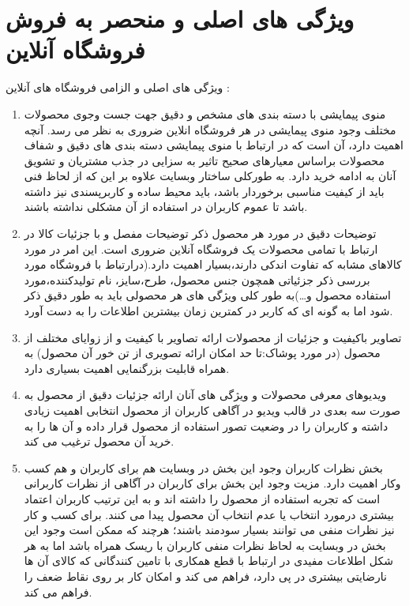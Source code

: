 \documentclass[14pt]{article}
\begin{document}
 
\section{ویژگی های اصلی و منحصر به فروش فروشگاه آنلاین}

ویژگی های اصلی و الزامی فروشگاه های آنلاین :

\begin{flushright}
\begin{enumerate}

\item منوی پیمایشی با دسته بندی های مشخص و دقیق جهت جست وجوی محصولات مختلف
\newline
وجود منوی پیمایشی در هر فروشگاه انلاین ضروری به نظر می رسد. آنچه اهمیت دارد، آن است که در ارتباط با منوی پیمایشی دسته بندی های دقیق و شفاف محصولات براساس معیارهای صحیح تاثیر به سزایی در جذب مشتریان و تشویق آنان به ادامه خرید دارد. به طورکلی ساختار وبسایت علاوه بر این که از لحاظ فنی باید از کیفیت مناسبی برخوردار باشد، باید محیط ساده و کاربرپسندی نیز داشته باشد تا عموم کاربران در استفاده از آن مشکلی نداشته باشند. 
\item توضیحات دقیق در مورد هر محصول
\newline
ذکر توضیحات مفصل و با جزئیات کالا در ارتباط با تمامی محصولات یک فروشگاه آنلاین ضروری است. این امر در مورد کالاهای مشابه که تفاوت اندکی دارند،‌بسیار اهمیت دارد.(درارتباط با فروشگاه مورد بررسی ذکر جزئیاتی همچون جنس محصول، طرح،سایز، نام تولیدکننده،مورد استفاده محصول و…)به طور کلی ویژگی های هر محصولی باید به طور دقیق ذکر شود اما به گونه ای که کاربر در کمترین زمان بیشترین اطلاعات را به دست آورد.
\item تصاویر باکیفیت و جزئیات از محصولات
\newline
ارائه تصاویر با کیفیت و از زوایای مختلف از محصول (در مورد پوشاک:تا حد امکان ارائه تصویری از تن خور آن محصول) به همراه قابلیت بزرگنمایی اهمیت بسیاری دارد.
\item ویدیوهای معرفی محصولات و ویژگی های آنان
\newline
ارائه جزئیات دقیق از محصول به صورت سه بعدی در قالب ویدیو در آگاهی کاربران از محصول انتخابی اهمیت زیادی داشته و کاربران را در وضعیت تصور استفاده از محصول قرار داده و آن ها را به خرید آن محصول ترغیب می کند.
\item بخش نظرات کاربران
\newline
وجود این بخش در وبسایت هم برای کاربران و هم کسب وکار اهمیت دارد. مزیت وجود این بخش برای کاربران در آگاهی از نظرات کاربرانی است که تجربه استفاده از محصول را داشته اند و به این ترتیب کاربران اعتماد بیشتری درمورد انتخاب یا عدم انتخاب آن محصول پیدا می کنند. برای کسب و کار نیز نظرات منفی می توانند بسیار سودمند باشند؛‌ هرچند که ممکن است وجود این بخش در وبسایت به لحاظ نظرات منفی کاربران با ریسک همراه باشد اما به هر شکل اطلاعات مفیدی در ارتباط با قطع همکاری با تامین کنندگانی که کالای آن ها نارضایتی بیشتری در پی دارد، فراهم می کند و امکان کار بر روی نقاط ضعف را فراهم می کند.

\end{enumerate}
\end{flushright}
\end{document}

